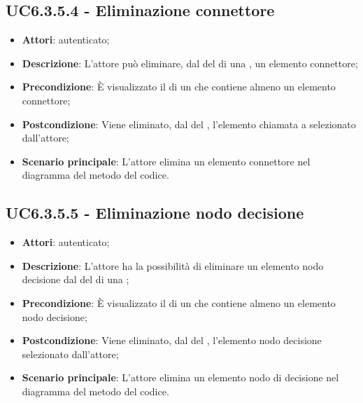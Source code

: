 \subsection{UC6.3.5.4 - Eliminazione connettore}
\label{ssec:UC6.3.5.4}
\begin{itemize}
\item \textbf{Attori}:  autenticato;
\item \textbf{Descrizione}: L'attore può eliminare, dal  del  di una , un elemento connettore;
\item \textbf{Precondizione}: È visualizzato il  di un  che contiene almeno un elemento connettore;
\item \textbf{Postcondizione}: Viene eliminato, dal  del ,  l'elemento chiamata a  selezionato dall'attore;
\item \textbf{Scenario principale}: L'attore elimina un elemento connettore nel diagramma del metodo del codice.
\end{itemize}
\subsection{UC6.3.5.5 - Eliminazione nodo decisione}
\label{ssec:UC6.3.5.5}
\begin{itemize}
\item \textbf{Attori}:  autenticato;
\item \textbf{Descrizione}: L'attore ha la possibilità di eliminare un elemento nodo decisione dal  del  di una ;
\item \textbf{Precondizione}: È visualizzato il  di un  che contiene almeno un elemento nodo decisione;
\item \textbf{Postcondizione}: Viene eliminato, dal  del ,  l'elemento nodo decisione selezionato dall'attore;
\item \textbf{Scenario principale}: L'attore elimina un elemento nodo di decisione nel diagramma del metodo del codice.
\end{itemize}
